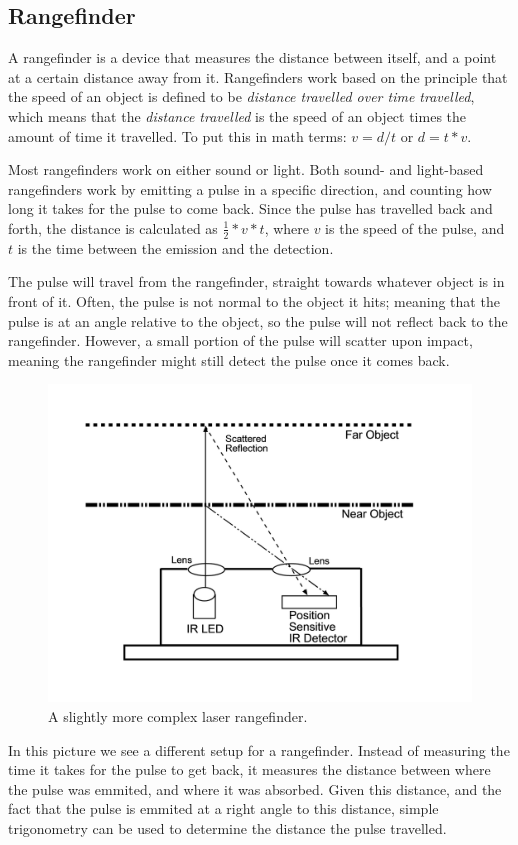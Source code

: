 \subsection{Rangefinder}
A rangefinder is a device that measures the distance between itself, and a point at a certain distance away from it. Rangefinders work based on the principle that the speed of an object is defined to be \textit{distance travelled over time travelled}, which means that the \textit{distance travelled} is the speed of an object times the amount of time it travelled. To put this in math terms: \(v=d/t\) or \(d=t*v\).

Most rangefinders work on either sound or light. Both sound- and light-based rangefinders work by emitting a pulse in a specific direction, and counting how long it takes for the pulse to come back. Since the pulse has travelled back and forth, the distance is calculated as \(\frac{1}{2}*v*t\), where \(v\) is the speed of the pulse, and \(t\) is the time between the emission and the detection.

The pulse will travel from the rangefinder, straight towards whatever object is in front of it. Often, the pulse is not normal to the object it hits; meaning that the pulse is at an angle relative to the object, so the pulse will not reflect back to the rangefinder. However, a small portion of the pulse will scatter upon impact, meaning the rangefinder might still detect the pulse once it comes back.

\begin{figure}[H]
	\centering
	\includegraphics[width=.6\linewidth]{images/rangefinder.jpg}
	\caption{A slightly more complex laser rangefinder.\cite{comp}}
	\label{fig:rangefinderIMG}
\end{figure}

In this picture we see a different setup for a rangefinder. Instead of measuring the time it takes for the pulse to get back, it measures the distance between where the pulse was emmited, and where it was absorbed. Given this distance, and the fact that the pulse is emmited at a right angle to this distance, simple trigonometry can be used to determine the distance the pulse travelled.

